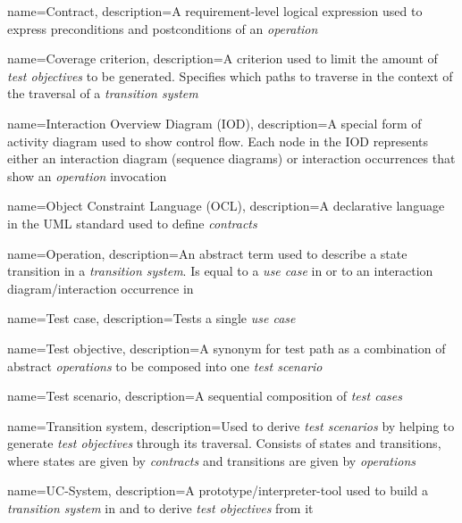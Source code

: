 {
	name={Contract},
	description={A requirement-level logical expression used to express preconditions and postconditions of an \textit{operation}}
}

{
	name={Coverage criterion},
	description={A criterion used to limit the amount of \textit{test objectives} to be generated. Specifies which paths to traverse in the context of the traversal of a \textit{transition system}}
}

{
	name={Interaction Overview Diagram (IOD)},
	description={A special form of activity diagram used to show control flow. Each node in the IOD represents either an interaction diagram (sequence diagrams) or interaction occurrences that show an \textit{operation} invocation}
}

{
	name={Object Constraint Language (OCL)},
	description={A declarative language in the UML standard used to define \textit{contracts}}
}

{
	name={Operation},
	description={An abstract term used to describe a state transition in a \textit{transition system}. Is equal to a \textit{use case} in \cite{ClementineNebut2006} or to an interaction diagram/interaction occurrence in \cite{NajlaRaza2007}}
}

{
	name={Test case},
	description={Tests a single \textit{use case}}
}

{
	name={Test objective},
	description={A synonym for test path as a combination of abstract \textit{operations} to be composed into one \textit{test scenario}}
}

{
	name={Test scenario},
	description={A sequential composition of \textit{test cases}}
}

{
	name={Transition system},
	description={Used to derive \textit{test scenarios} by helping to generate \textit{test objectives} through its traversal. Consists of states and transitions, where states are given by \textit{contracts} and transitions are given by \textit{operations}}
}

{
	name={UC-System},
	description={A prototype/interpreter-tool used to build a \textit{transition system} in \cite{ClementineNebut2006} and to derive \textit{test objectives} from it}
}

